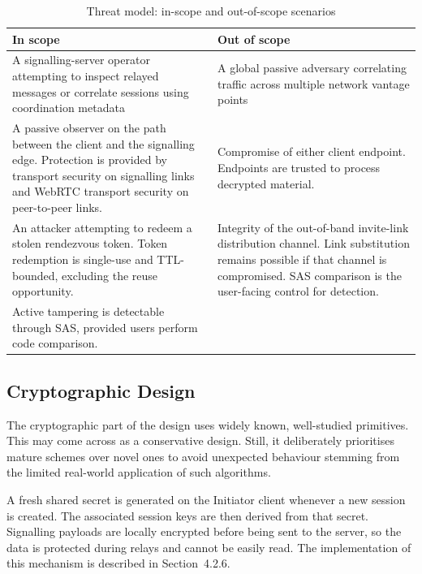 \documentclass[12pt,a4paper,oneside]{report}
\begin{document}
\begin{table}[htbp]
  \centering
  \caption{Threat model: in-scope and out-of-scope scenarios}
  \label{tab:threat-model}
  \small
  \begin{tabularx}{\textwidth}{>{\raggedright\arraybackslash}X >{\raggedright\arraybackslash}X}
    \toprule
    \textbf{In scope} & \textbf{Out of scope} \\
    \midrule
    A signalling-server operator attempting to inspect relayed messages or correlate sessions using coordination metadata &
    A global passive adversary correlating traffic across multiple network vantage points \\[6pt]

    A passive observer on the path between the client and the signalling edge. Protection is provided by transport security on signalling links and WebRTC transport security on peer-to-peer links. &
    Compromise of either client endpoint. Endpoints are trusted to process decrypted material. \\[6pt]

    An attacker attempting to redeem a stolen rendezvous token. Token redemption is single-use and TTL-bounded, excluding the reuse opportunity. &
    Integrity of the out-of-band invite-link distribution channel. Link substitution remains possible if that channel is compromised. SAS comparison is the user-facing control for detection. \\[6pt]

    Active tampering is detectable through SAS, provided users perform code comparison. & \\
    \bottomrule
  \end{tabularx}
\end{table}


\subsection{Cryptographic Design}
\label{sec:crypto-design}

The cryptographic part of the design uses widely known, well-studied primitives. This may come across as a conservative design. Still, it deliberately prioritises mature schemes over novel ones to avoid unexpected behaviour stemming from the limited real-world application of such algorithms.

A fresh shared secret is generated on the Initiator client whenever a new session is created. The associated session keys are then derived from that secret. Signalling payloads are locally encrypted before being sent to the server, so the data is protected during relays and cannot be easily read. The implementation of this mechanism is described in Section~4.2.6.
\end{document}
